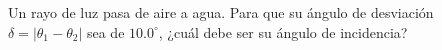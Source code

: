 \item Un rayo de luz pasa de aire a agua. Para que su ángulo de desviación $\delta = |\theta_1 - \theta_2|$ sea de $10.0^\circ$, ¿cuál debe ser su ángulo de incidencia?